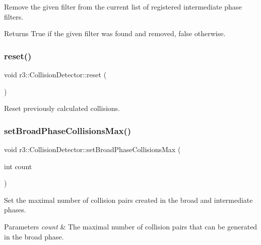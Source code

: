Remove the given filter from the current list of registered intermediate phase filters. \begin{DoxyReturn}{Returns}
True if the given filter was found and removed, false otherwise. 
\end{DoxyReturn}
\mbox{\label{classr3_1_1_collision_detector_a8f9f9e0ecc67d950e79d024803dc916b}} 
\subsubsection{\texorpdfstring{reset()}{reset()}}
{\footnotesize\ttfamily void r3\+::\+Collision\+Detector\+::reset (\begin{DoxyParamCaption}{ }\end{DoxyParamCaption})}



Reset previously calculated collisions. 

\mbox{\label{classr3_1_1_collision_detector_a386e4e4027a98c154423c8aea9079138}} 
\subsubsection{\texorpdfstring{set\+Broad\+Phase\+Collisions\+Max()}{setBroadPhaseCollisionsMax()}}
{\footnotesize\ttfamily void r3\+::\+Collision\+Detector\+::set\+Broad\+Phase\+Collisions\+Max (\begin{DoxyParamCaption}\item[{int}]{count }\end{DoxyParamCaption})}



Set the maximal number of collision pairs created in the broad and intermediate phases. 


\begin{DoxyParams}{Parameters}
{\em count} & The maximal number of collision pairs that can be generated in the broad phase. \\
\hline
\end{DoxyParams}
\mbox{\label{classr3_1_1_collision_detector_a2184ca2db73a6446cf028e3b742c7cc4}} 
